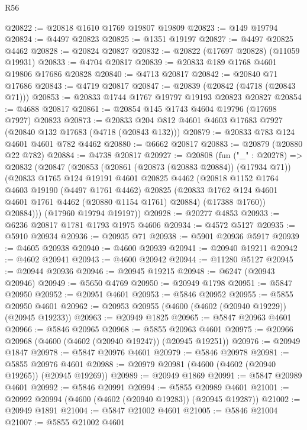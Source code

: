 \begin{lexlean}{R56}
\begin{coremodule}
@20822 := @20818 @1610 @1769 @19807 @19809
@20823 := @149 @19794
@20824 := @4497 @20823
@20825 := @1351 @19197
@20827 := @4497 @20825 @4462
@20828 := @20824 @20827
@20832 := @20822 (@17697 @20828) (@11059 @19931)
@20833 := @4704 @20817
@20839 := @20833 @189 @1768 @4601 @19806 @17686 @20828
@20840 := @4713 @20817
@20842 := @20840 @71 @17686
@20843 := @4719 @20817
@20847 := @20839 (@20842 (@4718 (@20843 @71)))
@20853 := @20833 @1744 @1767 @19797 @19193 @20823 @20827
@20854 := @4688 @20817
@20861 := @20854 @145 @1743 @4604 @19796 (@17698 @7927) @20823
@20873 := @20833 @204 @812 @4601 @4603 @17683 @7927 (@20840 @132 @17683 (@4718 (@20843 @132)))
@20879 := @20833 @783 @124 @4601 @4601 @782 @4462
@20880 := @6662 @20817
@20883 := @20879 (@20880 @22 @782)
@20884 := @4738 @20817
@20927 := @20808
    (fun ("_" : @20278) =>
    @20832
      (@20847
        (@20853
          (@20861 (@20873 (@20883 @20884)) (@17934 @71))
          (@20833
            @1765
            @124
            @19191
            @4601
            @20825
            @4462
            (@20818
              @1152
              @1764
              @4603
              @19190
              (@4497 @1761 @4462)
              @20825
              (@20833 @1762 @124 @4601 @4601 @1761 @4462 (@20880 @1154 @1761) @20884)
              (@17388 @1760))
            @20884)))
      (@17960 @19794 @19197))
@20928 := @20277 @4853
@20933 := @6236 @20817 @1781 @1793 @1975 @4606
@20934 := @4572 @5127
@20935 := @5910 @20934
@20936 := @20935 @71
@20938 := @5901 @20936 @5917
@20939 := @4605 @20938
@20940 := @4600 @20939
@20941 := @20940 @19211
@20942 := @4602 @20941
@20943 := @4600 @20942
@20944 := @11280 @5127
@20945 := @20944 @20936
@20946 := @20945 @19215
@20948 := @6247 (@20943 @20946)
@20949 := @5650 @4769
@20950 := @20949 @1798
@20951 := @5847 @20950
@20952 := @20951 @4601
@20953 := @5846 @20952
@20955 := @5855 @20950 @4601
@20962 := @20953 @20955 (@4600 (@4602 (@20940 @19229)) (@20945 @19233))
@20963 := @20949 @1825
@20965 := @5847 @20963 @4601
@20966 := @5846 @20965
@20968 := @5855 @20963 @4601
@20975 := @20966 @20968 (@4600 (@4602 (@20940 @19247)) (@20945 @19251))
@20976 := @20949 @1847
@20978 := @5847 @20976 @4601
@20979 := @5846 @20978
@20981 := @5855 @20976 @4601
@20988 := @20979 @20981 (@4600 (@4602 (@20940 @19265)) (@20945 @19269))
@20989 := @20949 @1869
@20991 := @5847 @20989 @4601
@20992 := @5846 @20991
@20994 := @5855 @20989 @4601
@21001 := @20992 @20994 (@4600 (@4602 (@20940 @19283)) (@20945 @19287))
@21002 := @20949 @1891
@21004 := @5847 @21002 @4601
@21005 := @5846 @21004
@21007 := @5855 @21002 @4601

\end{coremodule}
\end{lexlean}
